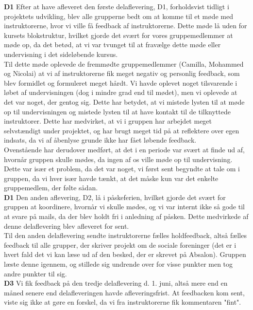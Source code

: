 \documentclass[]{article}
\begin{document}
\textbf{D1} Efter at have afleveret den første delaflevering, D1, forholdsvist tidligt i projektets udvikling, blev alle grupperne bedt om at komme til et møde med instruktorerne, hvor vi ville få feedback af instruktorerne. Dette møde lå uden for kursets blokstruktur, hvilket gjorde det svært for vores gruppemedlemmer at møde op, da det betød, at vi var tvunget til at fravælge dette møde eller undervisning i det sideløbende kursus. \\
\indent Til dette møde oplevede de fremmødte gruppemedlemmer (Camilla, Mohammed og Nicolai)  at vi af instruktorerne fik meget negativ og personlig feedback, som blev formidlet og formuleret meget hårdt. Vi havde oplevet noget tilsvarende i løbet af undervisningen (dog i mindre grad end til mødet), men vi oplevede at det var noget, der gentog sig. Dette har betydet, at vi mistede lysten til at møde op til undervisningen og mistede lysten til at have kontakt til de tilknyttede instruktorer. Dette har medvirket, at vi i gruppen har arbejdet meget selvstændigt under projektet, og har brugt meget tid på at reflektere over egen indsats, da vi af åbenlyse grunde ikke har fået løbende feedback.\\
\indent Ovenstående har derudover medført, at det i en periode var svært at finde ud af, hvornår gruppen skulle mødes, da ingen af os ville møde op til undervisning. Dette var især et problem, da det var noget, vi først sent begyndte at tale om i gruppen, da vi hver især havde tænkt, at det måske kun var det enkelte gruppemedlem, der følte sådan. \\
\textbf{D1} Den anden aflevering, D2, lå i påskeferien, hvilket gjorde det svært for gruppen at koordinere, hvornår vi skulle mødes, og vi var internt ikke så gode til at svare på mails, da der blev holdt fri i anledning af påsken. Dette medvirkede af denne delaflevering blev afleveret for sent. \\
\indent Til den anden delaflevering sendte instruktorerne fælles holdfeedback, altså fælles feedback til alle grupper, der skriver projekt om de sociale foreninger (det er i hvert fald det vi kan læse ud af den besked, der er skrevet på Absalon). Gruppen læste denne igennem, og stillede sig undrende over for visse punkter men tog andre punkter til sig. \\
\textbf{D3} Vi fik feedback på den tredje delaflevering d. 1. juni, altså mere end en måned senere end delafleveringen havde afleveringsfrist. At feedbacken kom sent, viste sig ikke at gøre en forskel, da vi fra instruktorerne fik kommentaren "fint".\\
\end{document}
